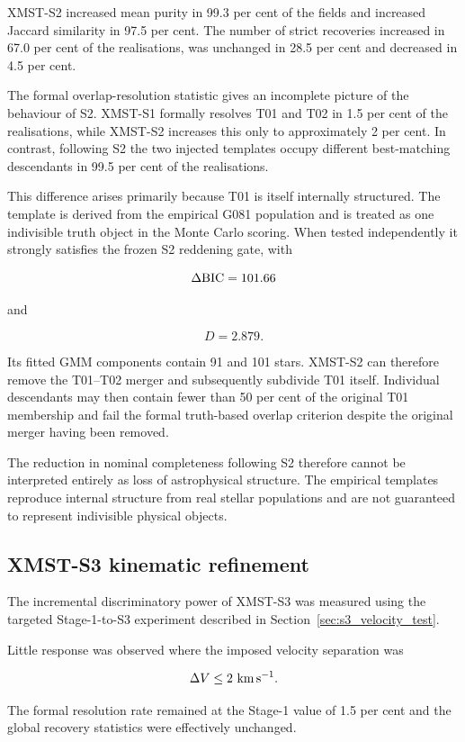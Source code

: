 \documentclass[fleqn,usenatbib]{rasti}
\begin{document}
XMST-S2 increased mean purity in 99.3 per cent of the fields and increased
Jaccard similarity in 97.5 per cent. The number of strict recoveries
increased in 67.0 per cent of the realisations, was unchanged in
28.5 per cent and decreased in 4.5 per cent.

The formal overlap-resolution statistic gives an incomplete picture of the
behaviour of S2. XMST-S1 formally resolves T01 and T02 in 1.5 per cent of
the realisations, while XMST-S2 increases this only to approximately
2 per cent. In contrast, following S2 the two injected templates occupy
different best-matching descendants in 99.5 per cent of the realisations.

This difference arises primarily because T01 is itself internally
structured. The template is derived from the empirical G081 population and
is treated as one indivisible truth object in the Monte Carlo scoring. When
tested independently it strongly satisfies the frozen S2 reddening gate,
with

\[
\Delta{\rm BIC}=101.66
\]

and

\[
D=2.879.
\]

Its fitted GMM components contain 91 and 101 stars. XMST-S2 can therefore
remove the T01--T02 merger and subsequently subdivide T01 itself.
Individual descendants may then contain fewer than 50 per cent of the
original T01 membership and fail the formal truth-based overlap criterion
despite the original merger having been removed.

The reduction in nominal completeness following S2 therefore cannot be
interpreted entirely as loss of astrophysical structure. The empirical
templates reproduce internal structure from real stellar populations and
are not guaranteed to represent indivisible physical objects.


\subsection{XMST-S3 kinematic refinement}

The incremental discriminatory power of XMST-S3 was measured using the
targeted Stage-1-to-S3 experiment described in
Section~\ref{sec:s3_velocity_test}.

Little response was observed where the imposed velocity separation was

\[
\Delta V\leq2~{\rm km\,s^{-1}}.
\]

The formal resolution rate remained at the Stage-1 value of 1.5 per cent
and the global recovery statistics were effectively unchanged.
\end{document}
